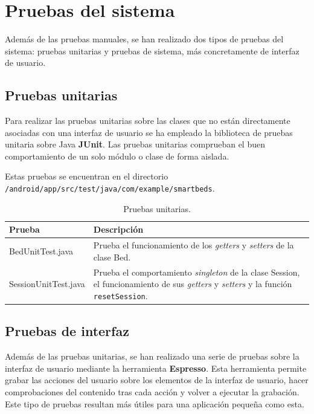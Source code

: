 \section{Pruebas del sistema}

Además de las pruebas manuales, se han realizado dos tipos de pruebas del sistema: pruebas unitarias y pruebas de sistema, más concretamente de interfaz de usuario. 

\subsection{Pruebas unitarias} 

Para realizar las pruebas unitarias sobre las clases que no están directamente asociadas con una interfaz de usuario se ha empleado la biblioteca de pruebas unitaria sobre Java \textbf{JUnit}. Las pruebas unitarias comprueban el buen comportamiento de un solo módulo o clase de forma aislada.

Estas pruebas se encuentran en el directorio \\ \texttt{/android/app/src/test/java/com/example/smartbeds}. 

\begin{table}[H]
	\begin{tabularx}{\textwidth}{lX}
		\toprule 
		\textbf{Prueba} & \textbf{Descripción}\\
		\midrule
		BedUnitTest.java & Prueba el funcionamiento de los \textit{getters} y \textit{setters} de la clase Bed. \\
		SessionUnitTest.java & Prueba el comportamiento \textit{singleton} de la clase Session, el funcionamiento de sus \textit{getters} y \textit{setters} y la función \texttt{resetSession}. \\
		\bottomrule
	\end{tabularx}
	\caption{Pruebas unitarias.}
\end{table}

\subsection{Pruebas de interfaz}

Además de las pruebas unitarias, se han realizado una serie de pruebas sobre la interfaz de usuario mediante la herramienta \textbf{Espresso}. Esta herramienta permite grabar las acciones del usuario sobre los elementos de la interfaz de usuario, hacer comprobaciones del contenido tras cada acción y volver a ejecutar la grabación. Este tipo de pruebas resultan más útiles para una aplicación pequeña como esta. 

